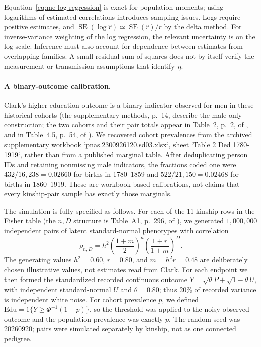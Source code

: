 Equation~\eqref{eq:me-log-regression} is exact for population moments;
using logarithms of estimated correlations introduces sampling issues.
Logs require positive estimates, and
$\operatorname{SE}(\log\widehat r)\simeq
\operatorname{SE}(\widehat r)/r$ by the delta method. For inverse-variance weighting of the log regression, the relevant
uncertainty is on the log scale. Inference must also account for
dependence between estimates from overlapping families. A small
residual sum of squares does not by itself verify the measurement or
transmission assumptions that identify $\eta$.
\paragraph{A binary-outcome calibration.}\mbox{}\par
Clark's higher-education outcome is a binary indicator observed for men in
these historical cohorts (the supplementary methods, p.~14, describe the
male-only construction; the two cohorts and their pair totals appear in
Table~2, p.~2, of \citet{Clark2023}, and in Table~4.5, p.~54, of
\citet{Clark2026}). We recovered cohort prevalences from the archived
supplementary workbook `pnas.2300926120.sd03.xlsx`, sheet `Table 2 Ded
1780-1919`, rather than from a published marginal table. After deduplicating
person IDs and retaining nonmissing male indicators, the fractions coded one
were $432/16{,}238=0.02660$ for births in 1780--1859 and
$522/21{,}150=0.02468$ for births in 1860--1919. These are workbook-based
calibrations, not claims that every kinship-pair sample has exactly those
marginals.

The simulation is fully specified as follows. For each of the 11 kinship rows
in the Fisher table (the $n,D$ structure is Table~A1, p.~296, of
\citet{Clark2026}), we generated $1{,}000{,}000$ independent pairs of latent
standard-normal phenotypes with correlation
\[
 \rho_{n,D}=h^2\left(\frac{1+m}{2}\right)^n
 \left(\frac{1+r}{1+m}\right)^D.
\]
The generating values $h^2=0.60$, $r=0.80$, and $m=h^2r=0.48$ are deliberately
chosen illustrative values, not estimates read from Clark. For each endpoint
we then formed the standardized recorded continuous outcome
$Y=\sqrt{\theta}P+\sqrt{1-\theta}U$, with independent standard-normal $U$ and
$\theta=0.80$; thus 20\% of recorded variance is independent white noise.
For cohort prevalence $p$, we defined
$\mathrm{Edu}=1\{Y\geq\Phi^{-1}(1-p)\}$, so the threshold was applied to the
noisy observed outcome and the population prevalence was exactly $p$. The
random seed was 20260920; pairs were simulated separately by kinship, not as
one connected pedigree.

